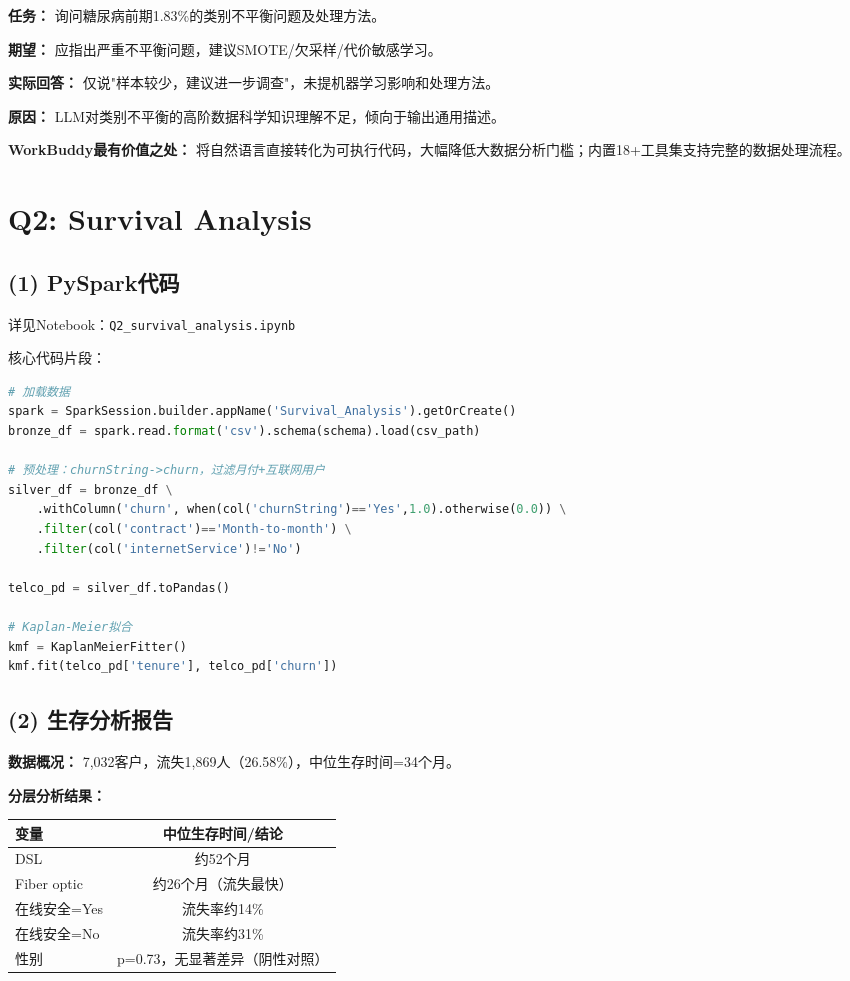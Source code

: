 \documentclass[12pt,a4paper]{article}
\begin{document}
\textbf{任务：} 询问糖尿病前期1.83\%的类别不平衡问题及处理方法。

\textbf{期望：} 应指出严重不平衡问题，建议SMOTE/欠采样/代价敏感学习。

\textbf{实际回答：} 仅说"样本较少，建议进一步调查"，未提机器学习影响和处理方法。

\textbf{原因：} LLM对类别不平衡的高阶数据科学知识理解不足，倾向于输出通用描述。

\textbf{WorkBuddy最有价值之处：} 将自然语言直接转化为可执行代码，大幅降低大数据分析门槛；内置18+工具集支持完整的数据处理流程。

\newpage
\section{Q2: Survival Analysis}

\subsection{(1) PySpark代码}
详见Notebook：\texttt{Q2\_survival\_analysis.ipynb}

核心代码片段：
\begin{lstlisting}[language=Python]
# 加载数据
spark = SparkSession.builder.appName('Survival_Analysis').getOrCreate()
bronze_df = spark.read.format('csv').schema(schema).load(csv_path)

# 预处理：churnString->churn，过滤月付+互联网用户
silver_df = bronze_df \
    .withColumn('churn', when(col('churnString')=='Yes',1.0).otherwise(0.0)) \
    .filter(col('contract')=='Month-to-month') \
    .filter(col('internetService')!='No')

telco_pd = silver_df.toPandas()

# Kaplan-Meier拟合
kmf = KaplanMeierFitter()
kmf.fit(telco_pd['tenure'], telco_pd['churn'])
\end{lstlisting}

\subsection{(2) 生存分析报告}

\textbf{数据概况：} 7,032客户，流失1,869人（26.58\%），中位生存时间=34个月。

\textbf{分层分析结果：}
\begin{table}[H]
\centering
\begin{tabular}{@{}lc@{}}
\toprule
变量 & 中位生存时间/结论 \\ \midrule
DSL & 约52个月 \\
Fiber optic & 约26个月（流失最快） \\
在线安全=Yes & 流失率约14\% \\
在线安全=No & 流失率约31\% \\
性别 & p=0.73，无显著差异（阴性对照） \\ \bottomrule
\end{tabular}
\end{table}
\end{document}
